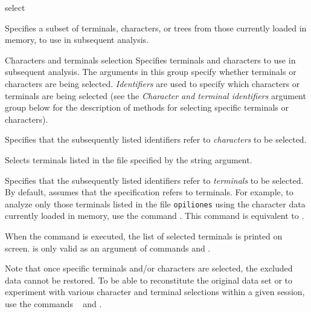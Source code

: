 
\begin{command}{select}{}


\begin{poydescription} 
Specifies a subset of terminals, characters, or trees from those
currently loaded in memory, to use in subsequent analysis.
\end{poydescription}


\begin{arguments}

\begin{argumentgroup}{Characters and terminals selection}
{Specifies terminals and characters to use in subsequent
analysis. 
The arguments in this group specify whether terminals or characters
are being selected.
\emph{Identifiers} are used to specify which characters or
terminals are being selected (see
the \emph{Character and terminal identifiers} argument group below
for the description of methods for selecting specific terminals or characters).}

{Specifies that the subsequently listed identifiers
refer to \emph{characters} to be selected.}
{}

{Selects terminals listed in the file specified by the string argument.}
{}

{Specifies that the subsequently listed identifiers
refer to \emph{terminals} to be selected. By default, \poy
assumes that the specification refers to terminals. For example, to
analyze only those terminals listed in the file \texttt{opiliones} using
the character data currently loaded in memory, use the command 
. This command is
equivalent to .

\setlength{\parindent}{0.5cm}                
\indent 
When the command is executed, the list of selected terminals is
printed on screen.  is only valid as an
argument of commands  and .} 
{}

\begin{statement}
Note that once specific terminals and/or characters are selected, the excluded
data cannot be restored. To be able to reconstitute the original data set or to
experiment with various character and terminal selections within a given \poy
session, use the commands ~ and .
\end{statement}


\end{argumentgroup}
\end{arguments}
\end{command}
